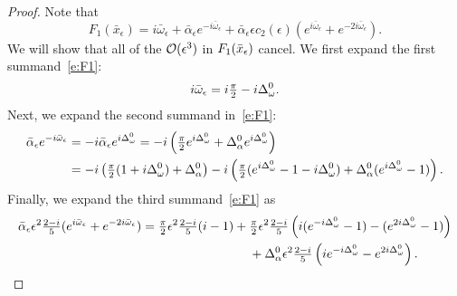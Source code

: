 %
\begin{proof}
Note that 
\begin{equation}\label{e:F1}
F_1(\bar{x}_\epsilon ) =
 i \bar{\omega}_\epsilon + \bar{\alpha}_\epsilon e^{-i \bar{\omega}_\epsilon} + 
\bar{\alpha}_\epsilon \epsilon  c_2( \epsilon)  ( e^{i \bar{\omega}_\epsilon} + e^{-2 i \bar{\omega}_\epsilon}) .
\end{equation}
We will show that all of the $ \mathcal{O}(\epsilon^3)$ in $F_1(\bar{x}_\epsilon)$ cancel. 
We first expand the first summand~\eqref{e:F1}:
\begin{equation*}
	i \bar{\omega}_\epsilon  = i \tfrac{\pi}{2} -  i \Delta_\omega^0   \label{e:Y1a}.
\end{equation*}
Next, we expand the second summand in~\eqref{e:F1}:
\begin{alignat}{1}
\bar{\alpha}_\epsilon e^{- i \bar{\omega}_\epsilon }	&= - i \bar{\alpha}_\epsilon e^{i \Delta_\omega^0  }	
=  -i \left( \tfrac{\pi}{2}  e^{i \Delta_\omega^0 } +\Delta_\alpha^0  e^{i \Delta_\omega^0 } \right) \nonumber\\
&= -i \left(\tfrac{\pi}{2}  (1 + i \Delta_\omega^0 )   +\Delta_\alpha^0  \right)  
 -i \left( \tfrac{\pi}{2}  (e^{i \Delta_\omega^0 }-1- i \Delta_\omega^0) + \Delta_\alpha^0 (e^{i \Delta_\omega^0 }-1)\right) . \label{e:Y1b}
\end{alignat}
Finally, we expand the third summand~\eqref{e:F1} as
\begin{alignat}{1}
\bar{\alpha}_\epsilon \epsilon^2 \tfrac{2-i}{5} ( e^{i \bar{\omega}_\epsilon} + e^{-2 i \bar{\omega}_\epsilon})   &= 
\pp \epsilon^2 \tfrac{2-i}{5} (i  - 1) + \pp \epsilon^2 \tfrac{2-i}{5} \left(i (e^{- i \dw^0} -1)-(e^{2 i \dw^0}-1) \right) \nonumber \\
&\hspace*{3cm} +\da^0 \epsilon^2 \tfrac{2-i}{5} \left(i e^{- i \dw^0} - e^{2 i \dw^0} \right)  \label{e:Y1c}.
\end{alignat}

\end{proof}
